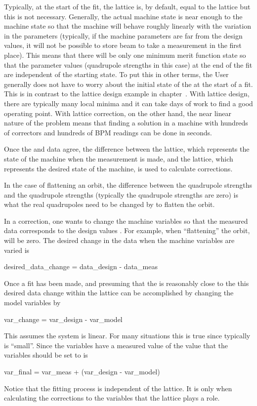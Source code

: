{{{Typically, at the start of the fit, the  lattice is, by default, equal to the 
lattice but this is not necessary. Generally, the actual machine state is near enough to the
 machine state so that the machine will behave roughly linearly with the variation in the
parameters (typically, if the machine parameters are far from the design values, it will not be
possible to store beam to take a measurement in the first place). This means that there will be only
one minimum merit function state so that the parameter values (quadrupole strengths in this case) at
the end of the fit are independent of the starting state. To put this in other terms, the User
generally does not have to worry about the initial state of the  at the start of a
fit. This is in contrast to the lattice design example in chapter~. With
lattice design, there are typically many local minima and it can take days of work to find a good
operating point. With lattice correction, on the other hand, the near linear nature of the problem
means that finding a solution in a machine with hundreds of correctors and hundreds of BPM readings
can be done in seconds.

Once the  and  data agree, the
difference between the  lattice, which represents the state of the machine when the
measurement is made, and the  lattice, which represents the desired state of the machine,
is used to calculate corrections. 

In the case of flattening an orbit, the difference between the
 quadrupole strengths and the  quadrupole strengths (typically the 
quadrupole strengths are zero) is what the real quadrupoles need to be changed by to flatten the orbit.

In a correction, one wants to change the machine variables so that the measured data corresponds to
the design values . For example, when ``flattening'' the orbit, 
will be zero. The desired change in the data when the machine variables are varied is
\begin{example}
  desired_data_change = data_design - data_meas
\end{example}
Once a fit has been made, and presuming that the  is reasonably close to the
 this desired data change within the  lattice can be accomplished by
changing the model variables by
\begin{example}
  var_change = var_design - var_model
\end{example}
This assumes the system is linear. For many situations this is true since typically 
is ``small''. Since the variables have a measured value of  the value that the
variables should be set to is
\begin{example}
  var_final = var_meas + (var_design - var_model)
\end{example}
Notice that the fitting process is independent of the  lattice. It is only when
calculating the corrections to the variables that the  lattice plays a role.

}}}

